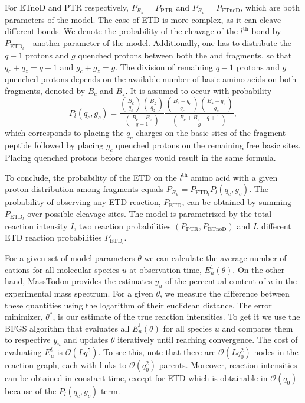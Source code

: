 \documentclass{llncs}
\begin{document}
For ETnoD and PTR respectively, $P_{R_u}=P_\text{PTR}$ and $P_{R_u}=P_\text{ETnoD}$, which are both parameters of the model.
The case of ETD is more complex, as it can cleave different bonds.
We denote the probability of the cleavage of the $l^\text{th}$ bond by $P_{\text{ETD}_l}$---another parameter of the model.
Additionally, one has to distribute the $q-1$ protons and $g$ quenched protons between both the  and  fragments, so that $q_c+q_z=q-1$ and $g_c+g_z = g$.
The division of remaining $q-1$ protons and $g$ quenched protons depends on the available number of basic amino-acids on both fragments, denoted by $B_c$ and $B_z$.
It is assumed to occur with probability
$$P_l(q_c, g_c) = \frac{ \binom{B_c}{q_c}\binom{B_z}{q_z} }{ \binom{B_c+B_z}{q-1} } \frac{ \binom{B_c - q_c}{g_c} \binom{B_z-q_z}{g_z} }{ \binom{B_c+B_z-q+1}{g} },$$
which corresponds to placing the $q_c$ charges on the basic sites of the fragment peptide followed by placing $g_c$ quenched protons on the remaining free basic sites. Placing quenched protons before charges would result in the same formula.

To conclude, the probability of the ETD on the $l^\text{th}$ amino acid with a given proton distribution among fragments equals $P_{R_u}=P_{\text{ETD}_l} P_l(q_c, g_c)$.
The probability of observing any ETD reaction, $P_\text{ETD}$, can be obtained by summing $P_{\text{ETD}_l}$ over possible cleavage sites.
The model is parametrized by the total reaction intensity $I$, two reaction probabilities $(P_\text{PTR}, P_\text{ETnoD})$ and $L$ different ETD reaction probabilities $P_{\text{ETD}_l}$.

For a given set of model parameters $\theta$ we can calculate the average number of cations for all molecular species $u$ at observation time, $E_u^1(\theta)$. On the other hand, {\sc MassTodon} provides the estimates $y_u$ of the percentual content of $u$ in the experimental mass spectrum. For a given $\theta$, we measure the difference between these quantities using the logarithm of their euclidean distance. The error minimizer, $\theta^*$, is our estimate of the true reaction intensities.
To get it we use the BFGS algorithm that evaluates all $E_u^1(\theta)$ for all species $u$ and compares them to respective $y_u$ and updates $\theta$ iteratively until reaching convergence.
The cost of evaluating $E_u^t$ is $\mathcal O(Lq^5)$.
To see this, note that there are $\mathcal O (Lq_0^2)$ nodes in the reaction graph, each with links to $\mathcal O(q_0^2)$ parents.
Moreover, reaction intensities can be obtained in constant time, except for ETD which is obtainable in $\mathcal O(q_0)$ because of the  $P_l(q_c, g_c)$ term.
\end{document}
